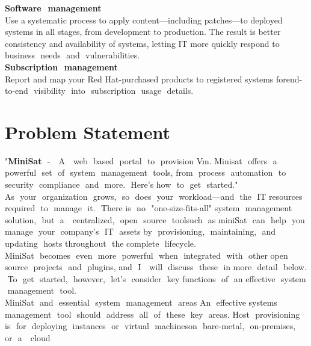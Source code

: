 \documentclass[a4paper,12pt]{report}
\begin{document}
\newline
\textbf{Software​ ​ management}\\
Use a systematic process to apply content—including patches—to deployed
systems in all stages, from development to production. The result is better
consistency and availability of systems, letting IT more quickly respond to
business​ ​ needs​ ​ and​ ​ vulnerabilities.\\
\newline
\textbf{Subscription​ ​ management}\\
Report and map your Red Hat-purchased products to registered systems
for​ ​ end-to-end​ ​ visibility​ ​ into​ ​ subscription​ ​ usage​ ​ details.


\newpage
\chapter{Problem Statement}
"\textbf{MiniSat}​ ​ - ​ ​ A ​ ​ web​ ​ based​ ​ portal​ ​ to​ ​ provision​ ​ Vm.
Minisat​ ​ offers​ ​ a ​ ​ powerful​ ​ set​ ​ of​ ​ system​ ​ management​ ​ tools,​ ​ from​ ​ process​ ​ automation​ ​ to
security​ ​ compliance​ ​ and​ ​ more.​ ​ Here's​ ​ how​ ​ to​ ​ get​ ​ started."\\
\newline
As​ ​ your​ ​ organization​ ​ grows,​ ​ so​ ​ does​ ​ your​ ​ workload—and​ ​ the​ ​ IT​ ​ resources​ ​ required​ ​ to​ ​ manage​ ​ it.​ ​ There
is​ ​ no​ ​ "one-size-fits-all"​ ​ system​ ​ management​ ​ solution,​ ​ but​ ​ a ​ ​ centralized,​ ​ open​ ​ source​ ​ tool​ ​ such​ ​ as
miniSat​ ​ can​ ​ help​ ​ you​ ​ manage​ ​ your​ ​ company's​ ​ IT​ ​ assets​ ​ by​ ​ provisioning,​ ​ maintaining,​ ​ and​ ​ updating​ ​ hosts
throughout​ ​ the​ ​ complete​ ​ lifecycle.\\
\newline
MiniSat​ ​ becomes​ ​ even​ ​ more​ ​ powerful​ ​ when​ ​ integrated​ ​ with​ ​ other​ ​ open​ ​ source​ ​ projects​ ​ and​ ​ plugins,
and​ ​ I ​ ​ will​ ​ discuss​ ​ these​ ​ in​ ​ more​ ​ detail​ ​ below.​ ​ To​ ​ get​ ​ started,​ ​ however,​ ​ let's​ ​ consider​ ​ key​ ​ functions​ ​ of​ ​ an
effective​ ​ system​ ​ management​ ​ tool.\\
\newline
MiniSat​ ​ and​ ​ essential​ ​ system​ ​ management​ ​ areas
An​ ​ effective​ ​ systems​ ​ management​ ​ tool​ ​ should​ ​ address​ ​ all​ ​ of​ ​ these​ ​ key​ ​ areas.
Host​ ​ provisioning​ ​ is​ ​ for​ ​ deploying​ ​ instances​ ​ or​ ​ virtual​ ​ machines​ ​ on​ ​ bare-metal,​ ​ on-premises,​ ​ or​ ​ a ​ ​ cloud
\end{document}
